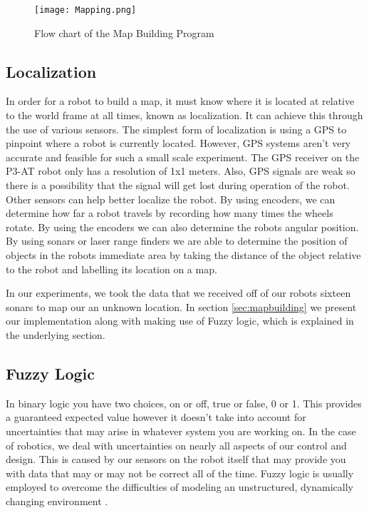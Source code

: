 \documentclass[12pt]{article}
\begin{document}
\begin{figure}[htp!]
	\begin{center}
		\texttt{[image: Mapping.png]}
		\caption{Flow chart of the Map Building Program}
	\end{center}
\end{figure}


\subsection{Localization}

In order for a robot to build a map, it must know where it is located at relative to the world frame at all times, known as localization. It can achieve this through the use of various sensors. The simplest form of localization is using a GPS to pinpoint where a robot is currently located. However, GPS systems aren't very accurate and feasible for such a small scale experiment. The GPS receiver on the P3-AT robot only has a resolution of 1x1 meters. Also, GPS signals are weak so there is a possibility that the signal will get lost during operation of the robot. Other sensors can help better localize the robot. By using encoders, we can determine how far a robot travels by recording how many times the wheels rotate. By using the encoders we can also determine the robots angular position. By using sonars or laser range finders we are able to determine the position of objects in the robots immediate area by taking the distance of the object relative to the robot and labelling its location on a map. 

In our experiments, we took the data that we received off of our robots sixteen sonars to map our an unknown location. In section \ref{sec:mapbuilding} we present our implementation along with making use of Fuzzy logic, which is explained in the underlying section. 


\subsection{Fuzzy Logic} \label{sec:fuzz}
In binary logic you have two choices, on or off, true or false, 0 or 1. This provides a guaranteed expected value however it doesn't take into account for uncertainties that may arise in whatever system you are working on. In the case of robotics, we deal with uncertainties on nearly all aspects of our control and design. This is caused by our sensors on the robot itself that may provide you with data that may or may not be correct all of the time. Fuzzy logic is usually employed to overcome the difficulties of modeling an unstructured, dynamically changing environment \cite{Fuzzy1}.
\end{document}
